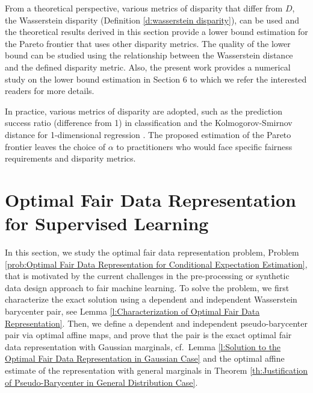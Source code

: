 \documentclass[twoside,11pt]{article}
\newcommand{\edit}[1]{\textcolor{blue}{#1}}
\begin{document}



From a theoretical perspective, various metrics of disparity that differ from $D$, the Wasserstein disparity (Definition \ref{d:wasserstein disparity}), can be used and the theoretical results derived in this section provide a lower bound estimation for the Pareto frontier that uses other disparity metrics. The quality of the lower bound can be studied using the relationship between the Wasserstein distance and the defined disparity metric. Also, the present work provides a numerical study on the lower bound estimation in Section 6 to which we refer the interested readers for more details.

In practice, various metrics of disparity are adopted, such as the prediction success ratio (difference from 1) in classification \cite{calmon2017optimized} and the Kolmogorov-Smirnov distance for 1-dimensional regression \cite{chzhen2020fair}.  The proposed estimation of the Pareto frontier leaves the choice of $\alpha$ to practitioners who would face specific fairness requirements and disparity metrics.

\section{Optimal Fair Data Representation for Supervised Learning}\label{s:Optimal Fair Data Representation}

In this section, we study the optimal fair data representation problem, Problem \ref{prob:Optimal Fair Data Representation for Conditional Expectation Estimation}, that is motivated by the current challenges in the pre-processing or synthetic data design approach to fair machine learning.  To solve the problem, we first characterize the exact solution using a dependent and independent Wasserstein barycenter pair, see Lemma \ref{l:Characterization of Optimal Fair Data Representation}. Then, we define a dependent and independent pseudo-barycenter pair via optimal affine maps, and prove that the pair is the exact optimal fair data representation with Gaussian marginals, cf.\ Lemma \ref{l:Solution to the Optimal Fair Data Representation in Gaussian Case} and the optimal affine estimate of the representation with general marginals in Theorem \ref{th:Justification of Pseudo-Barycenter in General Distribution Case}.
\end{document}
